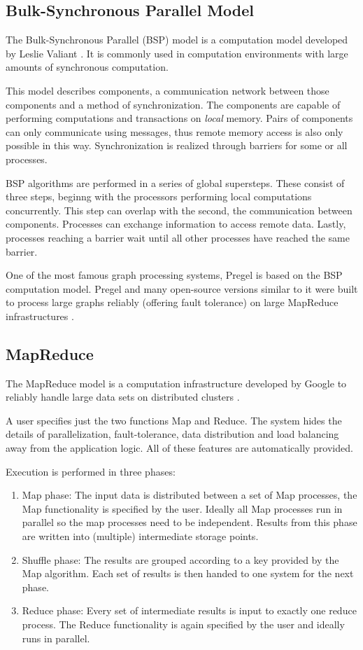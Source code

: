 \subsection{Bulk-Synchronous Parallel Model}
\label{sec:bsp}
The Bulk-Synchronous Parallel (BSP) model is a computation model developed by Leslie Valiant \cite{bsp}. It is commonly used in computation environments with large amounts of synchronous computation.

This model describes components, a communication network between those components and a method of synchronization.
The components are capable of performing computations and transactions on \emph{local} memory. Pairs of components can only communicate using messages, thus remote memory access is also only possible in this way.
Synchronization is realized through barriers for some or all processes.

BSP algorithms are performed in a series of global supersteps. These consist of three steps, beginng with the processors performing local computations concurrently.
This step can overlap with the second, the communication between components. Processes can exchange information to access remote data.
Lastly, processes reaching a barrier wait until all other processes have reached the same barrier.

One of the most famous graph processing systems, Pregel \cite{pregel} is based on the BSP computation model.
Pregel and many open-source versions similar to it were built to process large graphs reliably (offering fault tolerance) on large MapReduce infrastructures \cite{Giraph}.

\subsection{MapReduce}
The MapReduce model is a computation infrastructure developed by Google to reliably handle large data sets on distributed clusters \cite{mapreduce}.

A user specifies just the two functions Map and Reduce.
The system hides the details of parallelization, fault-tolerance, data distribution and load balancing away from the application logic.
All of these features are automatically provided.

Execution is performed in three phases:
\begin{enumerate}
	\item Map phase: The input data is distributed between a set of Map processes, the Map functionality is specified by the user. Ideally all Map processes run in parallel so the map processes need to be independent. Results from this phase are written into (multiple) intermediate storage points.
	\item Shuffle phase: The results are grouped according to a key provided by the Map algorithm. Each set of results is then handed to one system for the next phase.
	\item Reduce phase: Every set of intermediate results is input to exactly one reduce process. The Reduce functionality is again specified by the user and ideally runs in parallel.
\end{enumerate}

